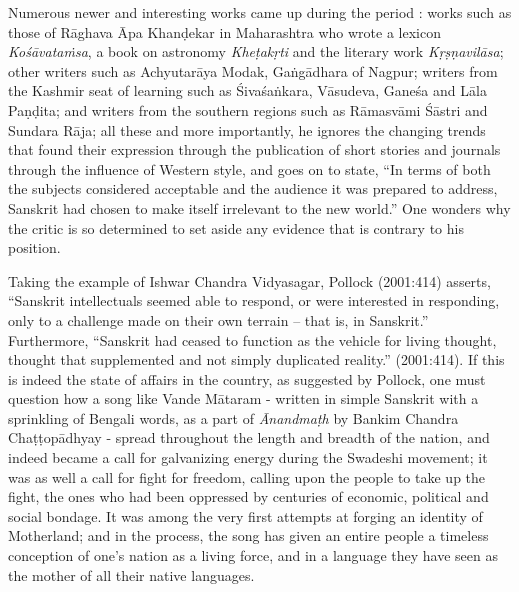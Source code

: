 Numerous newer and interesting works came up during the period : works such as those of Rāghava Āpa Khanḍekar in Maharashtra who wrote  a lexicon {\sl Kośāvataṁsa}, a book on astronomy {\sl Kheṭakṛti} and the literary work {\sl Kṛṣṇavilāsa}; other writers such as Achyutarāya Modak, Gaṅgādhara of Nagpur; writers from the Kashmir seat of learning such as Śivaśaṅkara, Vāsudeva, Ganeśa and Lāla Paṇḍita; and writers from the southern regions such as Rāmasvāmi Śāstri and  Sundara Rāja; all these and more importantly, he ignores the changing trends that found their expression through the publication of short stories and journals through the influence of Western style, and goes on to state, “In terms of both the subjects considered acceptable and the audience it was prepared to address, Sanskrit had chosen to make itself irrelevant to the new world.” One wonders why the critic is so determined to set aside any evidence that is contrary to his position.

Taking the example of Ishwar Chandra Vidyasagar, Pollock (2001:414) asserts, “Sanskrit intellectuals seemed able to respond, or were interested in responding, only to a challenge made on their own terrain – that is, in Sanskrit.” Furthermore, “Sanskrit had ceased to function as the vehicle for living thought, thought that supplemented and not simply duplicated reality.” (2001:414). If this is indeed the state of affairs in the country, as suggested by Pollock, one must question how a song like Vande Mātaram - written in simple Sanskrit with a sprinkling of Bengali words, as a part of {\sl Ānandmaṭh} by Bankim Chandra Chaṭṭopādhyay - spread throughout the length and breadth of the nation, and indeed became a call for galvanizing energy during the Swadeshi movement; it was as well a call for fight for freedom, calling upon the people to take up the fight, the ones who had been oppressed by centuries of economic, political and social bondage. It was among the very first attempts at forging an identity of Motherland; and in the process, the song has given an entire people a timeless conception of one’s nation as a living force, and in a language they have seen as the mother of all their native languages. 

